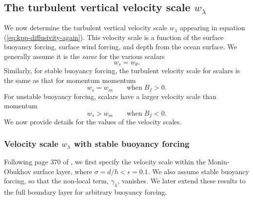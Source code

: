 \subsection{The turbulent vertical velocity scale $w_{\lambda}$} 
\label{subsection:vertical-velocity-scale}

We now determine the turbulent vertical velocity scale $w_{\lambda}$
appearing in equation (\ref{eq:kpp-diffusivity-again}).  This velocity
scale is a function of the surface buoyancy forcing, surface wind
forcing, and depth from the ocean surface.  We generally assume it is
the {\it same} for the various scalars
\begin{equation}
 w_{s} = w_{\theta}. 
\end{equation}
Similarly, for stable buoyancy forcing, the turbulent velocity scale
for scalars is the same as that for momentum momentum
\begin{equation}
 w_{s} = w_{m} \qquad \mbox{when} \; B_{f} > 0. 
\end{equation}
For unstable buoyancy forcing, scalars have a larger velocity scale
than momentum
\begin{equation}
 w_{s}  > w_{m} \qquad \mbox{when} \;  B_{f} < 0. 
\end{equation}
 We now provide details for the values of the velocity scales.  


\subsubsection{Velocity scale $w_{\lambda}$ with stable buoyancy forcing}

Following page 370 of \cite{LargeKPP}, we first specify the velocity
scale within the Monin-Obukhov surface layer, where $\sigma = d/h <
\epsilon = 0.1$.  We also assume stable buoyancy forcing, so that the
non-local term, $\gamma_{\lambda}$, vanishes.  We later extend these
results to the full boundary layer for arbitrary buoyancy forcing.

